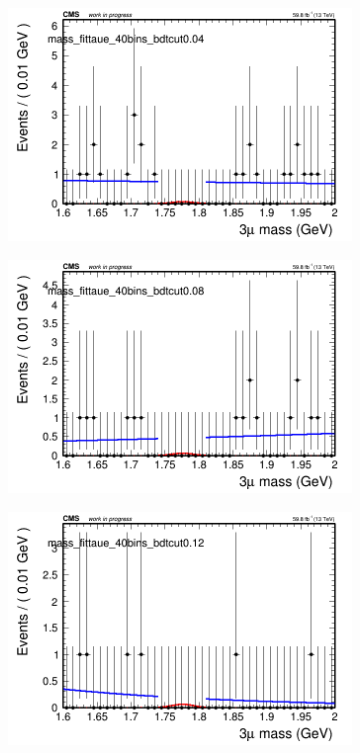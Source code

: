 \begin{figure}[H]
\begin{subfigure}{0.2\textwidth}
        \includegraphics[width=\textwidth]{unfixed_exp/plots/taue/massfit_taue_40bins_bdtcut0.04.png}
        \caption{}
    \end{subfigure}
    \begin{subfigure}{0.2\textwidth}
        \includegraphics[width=\textwidth]{unfixed_exp/plots/taue/massfit_taue_40bins_bdtcut0.08.png}
        \caption{}
    \end{subfigure}
    \begin{subfigure}{0.2\textwidth}
        \includegraphics[width=\textwidth]{unfixed_exp/plots/taue/massfit_taue_40bins_bdtcut0.12.png}

\end{subfigure}
\end{figure}
